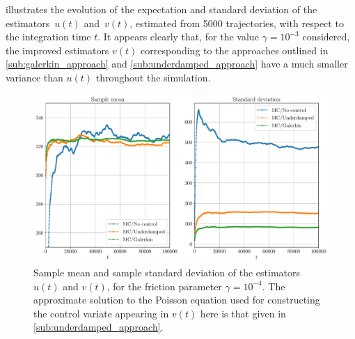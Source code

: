 \documentclass[11pt,a4paper]{article}
\theoremstyle{plain}
\numberwithin{equation}{section}
\begin{document}
 illustrates the evolution of the expectation and standard deviation of the estimators~$u(t)$ and~$v(t)$,
estimated from 5000 trajectories,
with respect to the integration time $t$.
It appears clearly that,
for the value $\gamma = 10^{-3}$ considered,
the improved estimators $v(t)$ corresponding to the approaches outlined in \cref{sub:galerkin_approach} and \cref{sub:underdamped_approach}
have a much smaller variance than $u(t)$ throughout the simulation.
\begin{figure}[ht]
    \centering
    \includegraphics[width=0.99\linewidth]{figures/time.pdf}
    \caption{
        Sample mean and sample standard deviation of the estimators $u(t)$ and $v(t)$,
        for the friction parameter $\gamma = 10^{-4}$.
        The approximate solution to the Poisson equation used for constructing the control variate appearing in $v(t)$ here
        is that given in \cref{sub:underdamped_approach}.
    }%
    \label{fig:time_bias_variance}
\end{figure}

\end{document}
